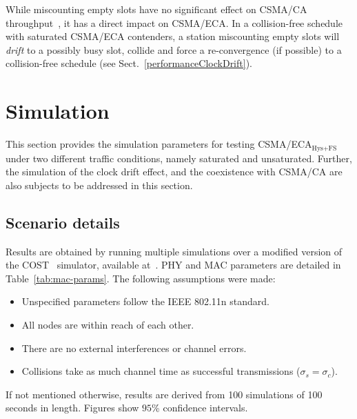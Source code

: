 \documentclass[a4paper,journal]{IEEEtran}
\begin{document}
	While miscounting empty slots have no significant effect on CSMA/CA throughput~\cite{slotDrift}, it has a direct impact on CSMA/ECA. In a collision-free schedule with saturated CSMA/ECA contenders, a station miscounting empty slots will \emph{drift} to a possibly busy slot, collide and force a re-convergence (if possible) to a collision-free schedule (see Sect.~\ref{performanceClockDrift}).
	
\section{Simulation}\label{simulations}
This section provides the simulation parameters for testing CSMA/ECA$_{\text{Hys+FS}}$ under two different traffic conditions, namely saturated and unsaturated. Further, the simulation of the clock drift effect, and the coexistence with CSMA/CA are also subjects to be addressed in this section.

	\subsection{Scenario details}
	Results are obtained by running multiple simulations over a modified version of the COST~\cite{COST} simulator, available at~\cite{sim:parameters}. PHY and MAC parameters are detailed in Table~\ref{tab:mac-params}. The following assumptions were made:
	
	\begin{itemize}
		\item Unspecified parameters follow the IEEE 802.11n standard.
		\item All nodes are within reach of each other.
		\item There are no external interferences or channel errors.
		\item Collisions take as much channel time as successful transmissions ($\sigma_{s}=\sigma_{c}$).
	\end{itemize}
	
	If not mentioned otherwise, results are derived from 100 simulations of 100 seconds in length. Figures show $95$\% confidence intervals.
	
\end{document}

